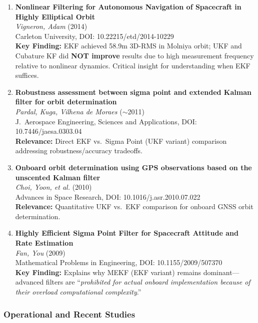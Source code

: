\documentclass[11pt]{article}
\begin{document}
\begin{enumerate}[label=\textbf{\arabic*.}]
    \item \textbf{Nonlinear Filtering for Autonomous Navigation of Spacecraft in Highly Elliptical Orbit}\\
    \textit{Vigneron, Adam} (2014)\\
    Carleton University, DOI: 10.22215/etd/2014-10229\\
    \textbf{Key Finding:} EKF achieved 58.9m 3D-RMS in Molniya orbit; UKF and Cubature KF did \textbf{NOT improve} results due to high measurement frequency relative to nonlinear dynamics. Critical insight for understanding when EKF suffices.

    \item \textbf{Robustness assessment between sigma point and extended Kalman filter for orbit determination}\\
    \textit{Pardal, Kuga, Vilhena de Moraes} ($\sim$2011)\\
    J.\ Aerospace Engineering, Sciences and Applications, DOI: 10.7446/jaesa.0303.04\\
    \textbf{Relevance:} Direct EKF vs.\ Sigma Point (UKF variant) comparison addressing robustness/accuracy tradeoffs.

    \item \textbf{Onboard orbit determination using GPS observations based on the unscented Kalman filter}\\
    \textit{Choi, Yoon, et al.} (2010)\\
    Advances in Space Research, DOI: 10.1016/j.asr.2010.07.022\\
    \textbf{Relevance:} Quantitative UKF vs.\ EKF comparison for onboard GNSS orbit determination.

    \item \textbf{Highly Efficient Sigma Point Filter for Spacecraft Attitude and Rate Estimation}\\
    \textit{Fan, You} (2009)\\
    Mathematical Problems in Engineering, DOI: 10.1155/2009/507370\\
    \textbf{Key Finding:} Explains why MEKF (EKF variant) remains dominant---advanced filters are ``\textit{prohibited for actual onboard implementation because of their overload computational complexity}.''
\end{enumerate}

\subsubsection{Operational and Recent Studies}
\end{document}
